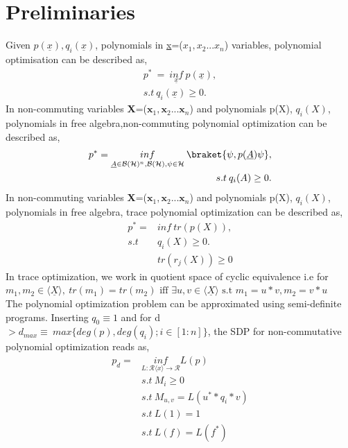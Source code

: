 \section{Preliminaries}
Given $p(\underline{x}),q_i(\underline{x})$, polynomials in \underline{x}=($x_1,x_2...x_n$) variables, polynomial optimisation can be described as,
\begin{equation}
\begin{split}
       p^* \: = \:\underset{\underline{x}}{inf} \: p(\underline{x}), \\
    s.t \: q_i(\underline{x}) \geq 0. 
\end{split}
\end{equation}
In non-commuting variables \textbf{X}=($\textbf{x}_1,\textbf{x}_2...\textbf{x}_n$) and polynomials p(X), $q_i(X)$, polynomials in free algebra,non-commuting polynomial optimization can be described as,
\begin{equation}
\begin{split}
       p^* =\underset{\underline{A} \in \mathcal{B}(\mathcal{H})^n, \mathcal{B}(\mathcal{H}), \psi \in \mathcal{H}}{inf} \: \braket{\psi,p(\underline{A}) \psi}, \\
    s.t \: q_i(A) \geq 0. 
\end{split}
\end{equation}
In non-commuting variables \textbf{X}=($\textbf{x}_1,\textbf{x}_2...\textbf{x}_n$) and polynomials p(X), $q_i(X)$, polynomials in free algebra, trace polynomial optimization can be described as,
\begin{equation}
\begin{split}
       p^* =& inf \: tr(p(X)), \\
    s.t \: & q_i(X) \geq 0. \\
     & tr(r_j(X)) \geq 0
\end{split}
\end{equation}
In trace optimization, we work in quotient space of cyclic equivalence i.e for $m_1,m_2 \in \langle \underline{X} \rangle, \: tr(m_1)=tr(m_2)\mbox{ iff } \exists u,v \in \langle \underline{X} \rangle\mbox{ s.t } m_1=u*v,m_2=v*u  $\\
The polynomial optimization problem can be approximated using semi-definite programs.  Inserting $q_0 \equiv 1$ and for d  $> d_{max} \equiv \: max\{deg(p), deg(q_i); i \in [1:n]\}$, the SDP for non-commutative polynomial optimization reads as,
\begin{equation}
    \begin{split}
        p_d = & \underset{L: \mathcal{R}\langle x\rangle \rightarrow{\mathcal{R}}}{inf} L(p) \\
        & s.t \:M_i \geq 0 \\
        & s.t \:M_{u,v}=L(u^**q_i*v) \\
        & s.t \:L(1)=1\\
        & s.t \:L(f)=L(f^*)
    \end{split}
\end{equation}
